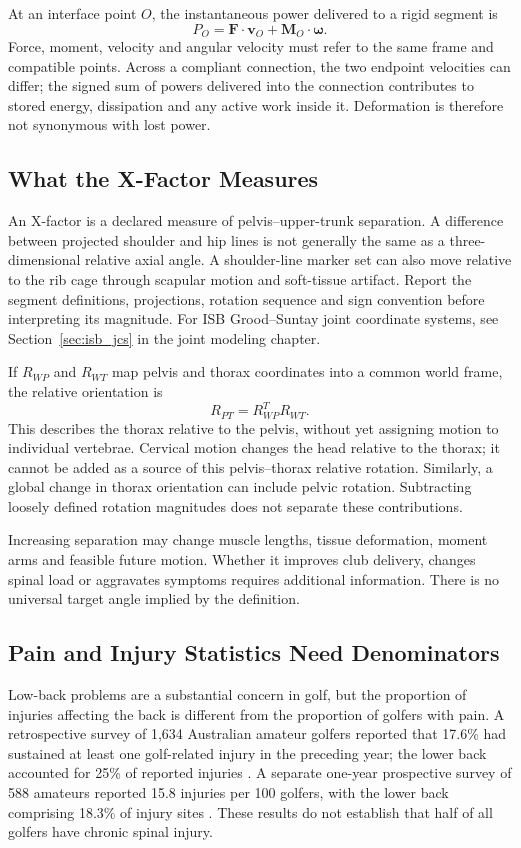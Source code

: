 At an interface point $O$, the instantaneous power delivered to a rigid segment is
\begin{equation}
P_O=\bm F\cdot\bm v_O+\bm M_O\cdot\bm\omega.
\end{equation}
Force, moment, velocity and angular velocity must refer to the same frame and compatible points. Across a compliant connection, the two endpoint velocities can differ; the signed sum of powers delivered into the connection contributes to stored energy, dissipation and any active work inside it. Deformation is therefore not synonymous with lost power.

\subsection{What the X-Factor Measures}
An X-factor is a declared measure of pelvis--upper-trunk separation. A difference between projected shoulder and hip lines is not generally the same as a three-dimensional relative axial angle. A shoulder-line marker set can also move relative to the rib cage through scapular motion and soft-tissue artifact. Report the segment definitions, projections, rotation sequence and sign convention before interpreting its magnitude. For ISB Grood--Suntay joint coordinate systems, see Section~\ref{sec:isb_jcs} in the joint modeling chapter.

If $R_{WP}$ and $R_{WT}$ map pelvis and thorax coordinates into a common world frame, the relative orientation is
\begin{equation}
R_{PT}=R_{WP}^{T}R_{WT}.
\end{equation}
This describes the thorax relative to the pelvis, without yet assigning motion to individual vertebrae. Cervical motion changes the head relative to the thorax; it cannot be added as a source of this pelvis--thorax relative rotation. Similarly, a global change in thorax orientation can include pelvic rotation. Subtracting loosely defined rotation magnitudes does not separate these contributions.

Increasing separation may change muscle lengths, tissue deformation, moment arms and feasible future motion. Whether it improves club delivery, changes spinal load or aggravates symptoms requires additional information. There is no universal target angle implied by the definition.

\subsection{Pain and Injury Statistics Need Denominators}
Low-back problems are a substantial concern in golf, but the proportion of injuries affecting the back is different from the proportion of golfers with pain. A retrospective survey of 1,634 Australian amateur golfers reported that 17.6\% had sustained at least one golf-related injury in the preceding year; the lower back accounted for 25\% of reported injuries \citep{McHardy2007BackSurvey}. A separate one-year prospective survey of 588 amateurs reported 15.8 injuries per 100 golfers, with the lower back comprising 18.3\% of injury sites \citep{McHardy2007Prospective}. These results do not establish that half of all golfers have chronic spinal injury.

